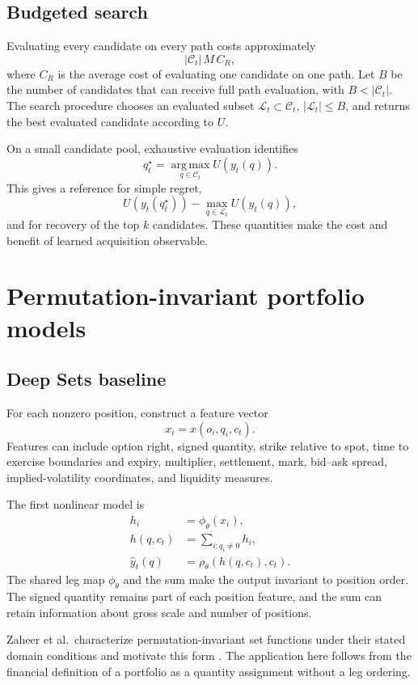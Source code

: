 \documentclass{strategynet-journal}
\begin{document}
\subsection{Budgeted search}

Evaluating every candidate on every path costs approximately
\[
  |\mathcal C_t|\,M\,C_R,
\]
where \(C_R\) is the average cost of evaluating one candidate on one path.
Let \(B\) be the number of candidates that can receive full path evaluation,
with \(B<|\mathcal C_t|\).  The search procedure chooses an evaluated subset
\(\mathcal L_t\subset\mathcal C_t\), \(|\mathcal L_t|\leq B\), and returns the
best evaluated candidate according to \(U\).

On a small candidate pool, exhaustive evaluation identifies
\[
  q_t^\star=\operatorname*{arg\,max}_{q\in\mathcal C_t}U(y_t(q)).
\]
This gives a reference for simple regret,
\[
  U(y_t(q_t^\star))
  -\max_{q\in\mathcal L_t}U(y_t(q)),
\]
and for recovery of the top \(k\) candidates.  These quantities make the cost
and benefit of learned acquisition observable.

\section{Permutation-invariant portfolio models}
\label{sec:model}

\subsection{Deep Sets baseline}

For each nonzero position, construct a feature vector
\[
  x_i=x(o_i,q_i,c_t).
\]
Features can include option right, signed quantity, strike relative to spot,
time to exercise boundaries and expiry, multiplier, settlement, mark,
bid--ask spread, implied-volatility coordinates, and liquidity measures.

The first nonlinear model is
\[
\begin{aligned}
  h_i &= \phi_\theta(x_i),\\
  h(q,c_t) &= \sum_{i:q_i\neq0}h_i,\\
  \widehat y_t(q) &= \rho_\theta(h(q,c_t),c_t).
\end{aligned}
\]
The shared leg map \(\phi_\theta\) and the sum make the output invariant to
position order.  The signed quantity remains part of each position feature,
and the sum can retain information about gross scale and number of positions.

Zaheer et al.\ characterize permutation-invariant set functions under their
stated domain conditions and motivate this form \cite{deepsets}.  The
application here follows from the financial definition of a portfolio as a
quantity assignment without a leg ordering.
\end{document}
